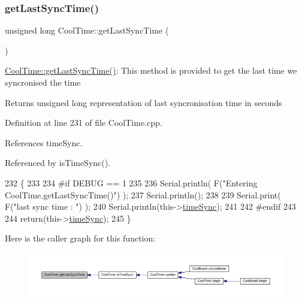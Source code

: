 \subsubsection{\texorpdfstring{get\+Last\+Sync\+Time()}{getLastSyncTime()}}
{\footnotesize\ttfamily unsigned long Cool\+Time\+::get\+Last\+Sync\+Time (\begin{DoxyParamCaption}{ }\end{DoxyParamCaption})}

\hyperlink{classCoolTime_a5d17f707a9d337720493b2bce9d41c21}{Cool\+Time\+::get\+Last\+Sync\+Time()}\+: This method is provided to get the last time we syncronised the time

\begin{DoxyReturn}{Returns}
unsigned long representation of last syncronisation time in seconds 
\end{DoxyReturn}


Definition at line 231 of file Cool\+Time.\+cpp.



References time\+Sync.



Referenced by is\+Time\+Sync().


\begin{DoxyCode}
232 \{
233 
234 \textcolor{preprocessor}{#if DEBUG == 1 }
235 
236     Serial.println( F(\textcolor{stringliteral}{"Entering CoolTime.getLastSyncTime()"}) );
237     Serial.println();
238     
239     Serial.print( F(\textcolor{stringliteral}{"last sync time : "}) );
240     Serial.println(this->\hyperlink{classCoolTime_a9d032e76c3470a15b3bbbc52af6463f7}{timeSync});
241 
242 \textcolor{preprocessor}{#endif }
243 
244     \textcolor{keywordflow}{return}(this->\hyperlink{classCoolTime_a9d032e76c3470a15b3bbbc52af6463f7}{timeSync});
245 \}
\end{DoxyCode}
Here is the caller graph for this function\+:\nopagebreak
\begin{figure}[H]
\begin{center}
\leavevmode
\includegraphics[width=350pt]{classCoolTime_a5d17f707a9d337720493b2bce9d41c21_icgraph}
\end{center}
\end{figure}
\mbox{\label{classCoolTime_a41fbbbfd651c2079f54d4b2911e4c705}} 
